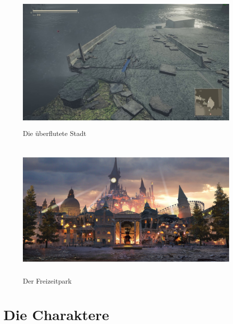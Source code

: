 \begin{figure}[h!]
	\centering
	\includegraphics[width=15cm,height=7cm]{Nier/world/water.jpg}
	\caption{Die überflutete Stadt}
	\label{img:passante}
\end{figure}

\begin{figure}[h!]
	\centering
	\includegraphics[width=15cm,height=7cm]{Nier/world/fun.jpg}
	\caption{Der Freizeitpark}
	\label{img:passante}
\end{figure}

\clearpage
\section{Die Charaktere}

